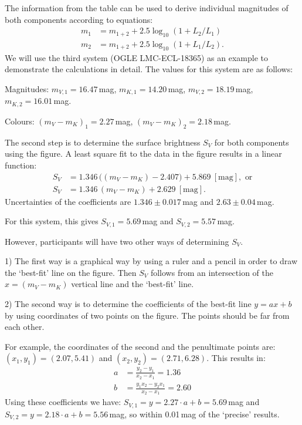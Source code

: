 The information from the table can be used to derive individual magnitudes of
both components according to equations:
\begin{align*}
  m_1 &= m_{1+2} + 2.5\log_{10}(1 + L_2/L_1) \\
  m_2 &= m_{1+2} + 2.5\log_{10}(1 + L_1/L_2).
\end{align*}
We will use the third system (OGLE LMC-ECL-18365) as an example to
demonstrate the calculations in detail. The values for this system are as
follows:

Magnitudes: $m_{V,1} = 16.47$\,mag, $m_{K,1} = 14.20$\,mag,
$m_{V,2} = 18.19$\,mag, $m_{K,2} = 16.01$\,mag.

Colours: $(m_V - m_K)_1 = 2.27$\,mag, $(m_V - m_K)_2 = 2.18$\,mag.

The second step is to determine the surface brightness $S_V$ for both
components using the figure. A least square fit to the data in the figure
results in a linear function:
\begin{align*}
  S_V &= 1.346\,\big((m_V - m_K) - 2.407\big) + 5.869\ [\mathrm{mag}],
    \text{ or} \\
  S_V &= 1.346\,(m_V - m_K) + 2.629\ [\mathrm{mag}].
\end{align*}
Uncertainties of the coefficients are $1.346 \pm 0.017$\,mag and
$2.63 \pm 0.04$\,mag.

For this system, this gives $S_{V,1} = 5.69$\,mag and $S_{V,2} = 5.57$\,mag.

However, participants will have two other ways of determining $S_V$.

1) The first way is a graphical way by using a ruler and a pencil in order to
draw the `best-fit' line on the figure. Then $S_V$ follows from an
intersection of the $x = (m_V - m_K)$ vertical line and the `best-fit' line.

2) The second way is to determine the coefficients of the best-fit line
$y = ax + b$ by using coordinates of two points on the figure. The points
should be far from each other.

For example, the coordinates of the second and the penultimate points are:
$(x_1, y_1) = (2.07, 5.41)$ and $(x_2, y_2) = (2.71, 6.28)$. This results in:
\begin{align*}
  a &= \frac{y_2 - y_1}{x_2 - x_1} = 1.36 \\
  b &= \frac{y_1 x_2 - y_2 x_1}{x_2 - x_1} = 2.60
\end{align*}
Using these coefficients we have:
$S_{V,1} = y = 2.27\cdot a + b = 5.69$\,mag and
$S_{V,2} = y = 2.18\cdot a + b = 5.56$\,mag, so within 0.01\,mag of the
`precise' results.

